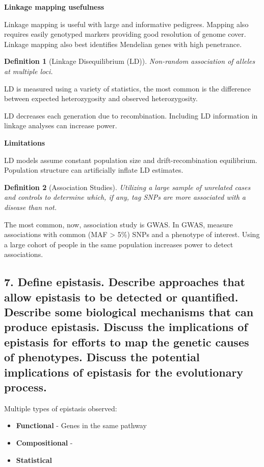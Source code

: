 \documentclass{tufte-handout}
\theoremstyle{noparens}
\newtheorem*{define}{Definition}
\begin{document}
\noindent
\textbf{Linkage mapping usefulness}

Linkage mapping is useful with large and informative pedigrees. Mapping also requires easily genotyped markers providing good resolution of genome cover. Linkage mapping also best identifies Mendelian genes with high penetrance.

\begin{define}[Linkage Disequilibrium (LD)]
Non-random association of alleles at multiple loci.
\end{define}

LD is measured using a variety of statistics, the most common is the difference between expected heterozygosity and observed heterozygosity.

LD decreases each generation due to recombination. Including LD information in linkage analyses can increase power. 

\textbf{Limitations}

LD models assume constant population size and drift-recombination equilibrium. Population structure can artificially inflate LD estimates.

\begin{define}[Association Studies]
Utilizing a large sample of unrelated cases and controls to determine which, if any, tag SNPs are more associated with a disease than not.
\end{define}

The most common, now, association study is GWAS. In GWAS, measure associations with common (MAF > 5\%) SNPs and a phenotype of interest. Using a large cohort of people in the same population increases power to detect associations.

\newpage
\subsection{7. Define epistasis. Describe approaches that allow epistasis to be detected or quantified. Describe some biological mechanisms that can produce epistasis. Discuss the implications of epistasis for efforts to map the genetic causes of phenotypes. Discuss the potential implications of epistasis for the evolutionary process.}
\label{subsec:07}

Multiple types of epistasis observed:

\begin{itemize}
\item \textbf{Functional} - Genes in the same pathway
\item \textbf{Compositional} - 
\item \textbf{Statistical}
\end{itemize}
\end{document}
